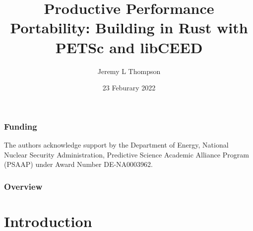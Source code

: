 \documentclass{beamer}
\title[Rust for HPC]{Productive Performance Portability: Building in Rust with PETSc and libCEED} %
\author{Jeremy L Thompson} %
\institute[CU Boulder] %
{University of Colorado Boulder \\ %
\medskip
\textit{jeremy@jeremylt.org} %
}
\date{23 Feburary 2022} %
\begin{document}
\begin{frame}
\titlepage %
\end{frame}


\begin{frame}
\begin{center}
\frametitle{Funding}

The authors acknowledge support by the Department of Energy, National Nuclear Security Administration, Predictive Science Academic Alliance Program (PSAAP) under Award Number DE-NA0003962.

\end{center}
\end{frame}
 

\begin{frame}
\frametitle{Overview} %
\tableofcontents %
\end{frame}


\section{Introduction}
\end{document}
